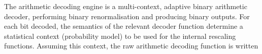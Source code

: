 

The arithmetic decoding engine is a multi-context, adaptive binary
arithmetic decoder, performing binary renormalisation and producing
binary outputs. For each bit decoded, the semantics of the relevant
decoder function determine a statistical context (probability model) to
be used for the internal rescaling functions. Assuming this context, the
raw arithmetic decoding function is written

\begin{comment}
binary\_arith\_decode()

Its operation is defined in Section .

Signed and unsigned integer outputs can be derived by the use of
binarisation schemes which turn a symbol into a string of bits. There
are two basic binarisations employed for arithmetic coding: unary and
truncated unary binarisation. These are defined in Appendix , giving
rise to four decoder functions 

Unsigned unary arithmetic decoding: uu\_arith\_decode()

Signed unary arithmetic decoding:   su\_arith\_decode()

Unsigned truncated unary arithmetic decoding:   ut\_arith\_decode()

In addition a decoding process may invoke halve\_all\_counts() to reset
context statistics.

\begin{informative}
There is no signed truncated unary arithmetic decoding function in
Dirac, since truncated unary values have been derived from modulo
arithmetic and have no sign.
\end{informative}
\end{comment}

